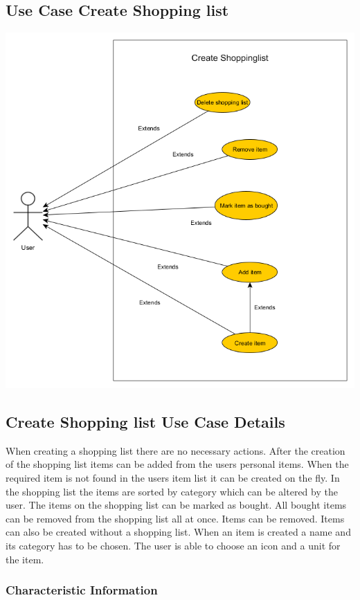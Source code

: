 \documentclass[12pt]{article}
\theoremstyle{definition}
\begin{document}
\subsection{Use Case Create Shopping list}

\includegraphics[scale=.5]{Images/UseCaseCreateShoppinglist.png}\\

\subsection{Create Shopping list Use Case Details}

When creating a shopping list there are no necessary actions. After the creation of the shopping list items can be added from the users personal items. When the required item is not found in the users item list it can be created on the fly. In the shopping list the items are sorted by category which can be altered by the user. The items on the shopping list can be marked as bought. All bought items can be removed from the shopping list all at once. Items can be removed. Items can also be created without a shopping list. When an item is created a name and its category has to be chosen. The user is able to choose an icon and a unit for the item.

\subsubsection{Characteristic Information}
\end{document}
